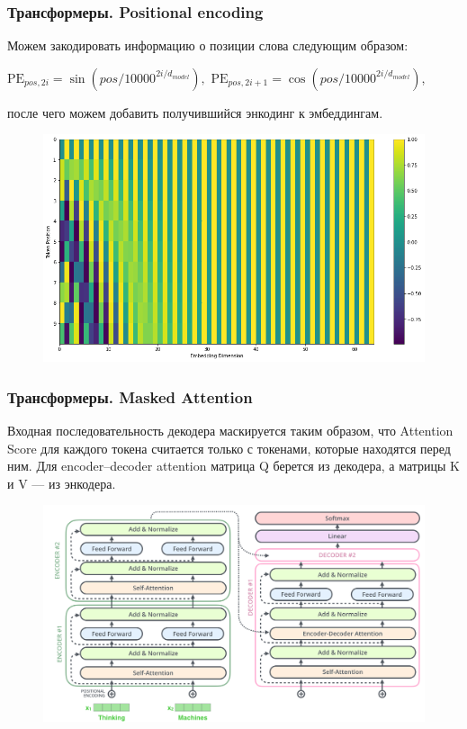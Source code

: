\documentclass[notheorems, handout]{beamer}
\begin{document}
	\begin{frame}
	\frametitle{Трансформеры. Positional encoding}
		Можем закодировать информацию о позиции слова следующим образом:
		
		$\mbox{PE}_{pos, 2i}=\sin(pos/10000^{2i/d_{model}}),$
		$\mbox{PE}_{pos, 2i+1}=\cos(pos/10000^{2i/d_{model}})$,
		
		после чего можем добавить получившийся энкодинг к эмбеддингам.
		\begin{figure}[H]
			\begin{center}
				\includegraphics[scale=0.3]{img/pos-enc.png}
			\end{center}
		\end{figure}
	\end{frame}
	
	\begin{frame}
	\frametitle{Трансформеры. Masked Attention}
	Входная последовательность декодера маскируется таким образом, что Attention Score для каждого токена считается только с токенами, которые находятся перед ним. Для encoder--decoder attention матрица Q берется из декодера, а матрицы K и V --- из энкодера.
		\begin{figure}[H]
			\begin{center}
				\includegraphics[scale=0.18]{img/transf.png}
			\end{center}
		\end{figure}
	\end{frame}
	
\end{document}
